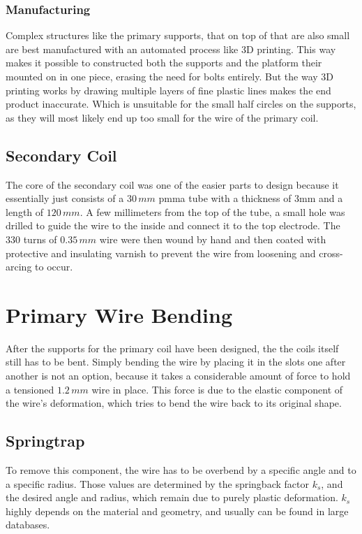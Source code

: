 \subsubsection{Manufacturing}

Complex structures like the primary supports, that on top of that are also small are best manufactured with an automated process like 3D printing. This way makes it possible to constructed both the supports and the platform their mounted on in one piece, erasing the need for bolts entirely. But the way 3D printing works by drawing multiple layers of fine plastic lines makes the end product inaccurate. Which is unsuitable for the small half circles on the supports, as they will most likely end up too small for the wire of the primary coil. 

\subsection{Secondary Coil}

The core of the secondary coil was one of the easier parts to design because it essentially just consists of a \(30\,mm\) \gls{pmma} tube with a thickness of 3mm and a length of \(120\,mm\). A few millimeters from the top of the tube, a small hole was drilled to guide the wire to the inside and connect it to the top electrode. The 330 turns of \(0.35\,mm\) wire were then wound by hand and then coated with protective and insulating varnish to prevent the wire from loosening and cross-arcing to occur.

\section{Primary Wire Bending}

After the supports for the primary coil have been designed, the the coils itself still has to be bent. Simply bending the wire by placing it in the slots one after another is not an option, because it takes a considerable amount of force to hold a tensioned \(1.2\,mm\) wire in place. 
This force is due to the elastic component of the wire's deformation, which tries to bend the wire back to its original shape. 

\subsection{Springtrap}

To remove this component, the wire has to be overbend by a specific angle and to a specific radius. Those values are determined by the springback factor \(k_s\), and the desired angle and radius, which remain due to purely plastic deformation. \(k_s\) highly depends on the material and geometry, and usually can be found in large databases.

